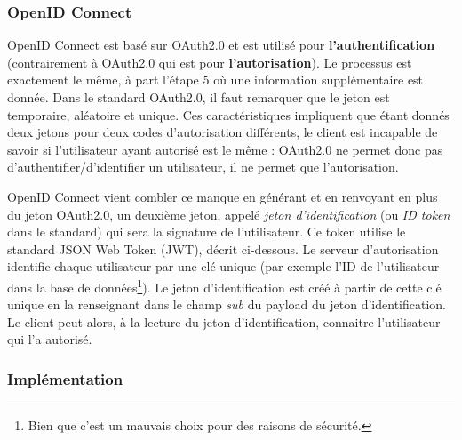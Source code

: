 \subsubsection*{OpenID Connect}

OpenID Connect est basé sur OAuth2.0 et est utilisé pour
\textbf{l'authentification} (contrairement à OAuth2.0 qui est pour
\textbf{l'autorisation}). Le processus est exactement le même, à part l'étape 5
où une information supplémentaire est donnée.
Dans le standard OAuth2.0, il faut remarquer que le jeton est temporaire, aléatoire et
unique. Ces caractéristiques impliquent que étant donnés deux jetons pour deux
codes d'autorisation différents, le client est
incapable de savoir si l'utilisateur ayant autorisé est le même : OAuth2.0
ne permet donc pas d'authentifier/d'identifier un utilisateur, il ne permet que l'autorisation.

OpenID Connect vient combler ce manque en générant et en renvoyant en plus du
jeton OAuth2.0, un deuxième jeton, appelé
\emph{jeton d'identification} (ou \emph{ID token} dans le standard) qui sera la
signature de l'utilisateur. Ce token utilise le standard JSON Web Token (JWT),
décrit ci-dessous. Le serveur d'autorisation identifie chaque utilisateur par
une clé unique (par exemple l'ID de l'utilisateur dans la base de données\footnote{Bien que c'est un mauvais choix pour
  des raisons de sécurité.}). Le jeton d'identification est créé à partir de
cette clé unique en la renseignant dans le champ \emph{sub} du payload du jeton
d'identification.
Le client peut alors, à la lecture du jeton d'identification, connaitre
l'utilisateur qui l'a autorisé.


\subsubsection*{Implémentation}

